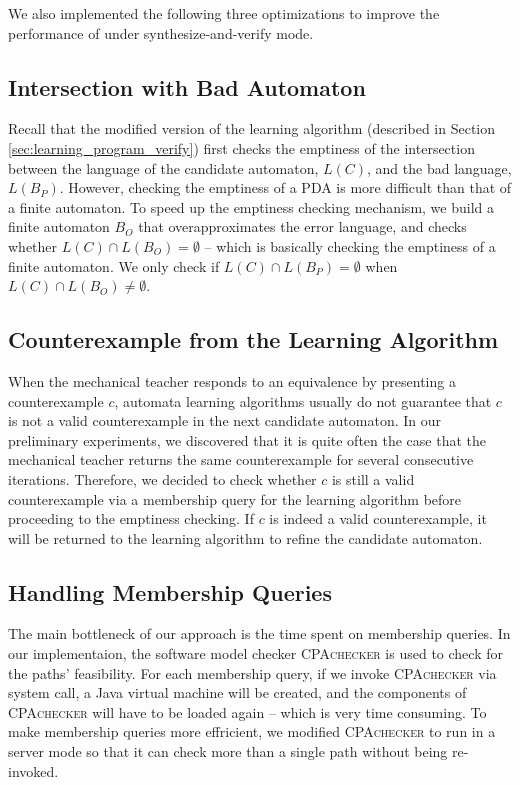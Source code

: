 We also implemented the following three optimizations to improve the performance of \PACMAN under synthesize-and-verify mode.

\subsection{Intersection with Bad Automaton}\label{subsec:intersection_B}

Recall that the modified version of the learning algorithm (described in Section \ref{sec:learning_program_verify}) first checks the emptiness of the intersection between the language of the candidate automaton, $L(C)$, and the bad language, $L(B_P)$. However, checking the emptiness of a PDA is more difficult than that of a finite automaton. To speed up the emptiness checking mechanism, we build a finite automaton $B_O$ that overapproximates the error language, and checks whether $L(C) \cap L(B_O) = \emptyset$ -- which is basically checking the emptiness of a finite automaton. We only check if $L(C) \cap L(B_P) = \emptyset$ when $L(C) \cap L(B_O) \neq \emptyset$. 

\subsection{Counterexample from the Learning Algorithm}\label{subsec:cex_learning_alg}

When the mechanical teacher responds to an equivalence by presenting a counterexample $c$, automata learning algorithms usually do not guarantee that $c$ is not a valid counterexample in the next candidate automaton. In our preliminary experiments, we discovered that it is quite often the case that the mechanical teacher returns the same counterexample for several consecutive iterations. Therefore, we decided to check whether $c$ is still a valid counterexample via a membership query for the learning algorithm before proceeding to the emptiness checking. If $c$ is indeed a valid counterexample, it will be returned to the learning algorithm to refine the candidate automaton. 

\subsection{Handling Membership Queries}\label{subsec:handle_mem}

The main bottleneck of our approach is the time spent on membership queries. In our implementaion, the software model checker \textsc{CPAchecker} is used to check for the paths' feasibility. For each membership query, if we invoke \textsc{CPAchecker} via system call, a Java virtual machine will be created, and the components of \textsc{CPAchecker} will have to be loaded again -- which is very time consuming. To make membership queries more effricient, we modified \textsc{CPAchecker} to run in a server mode so that it can check more than a single path without being re-invoked. 

